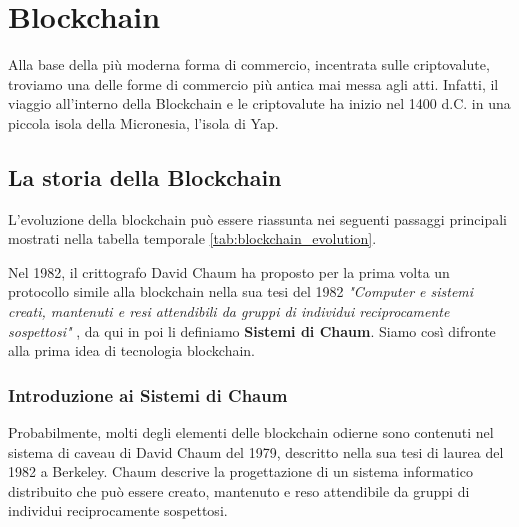 \chapter{Blockchain}
Alla base della più moderna forma di commercio, incentrata sulle criptovalute, troviamo una delle forme di commercio più antica mai messa agli atti. Infatti, il viaggio all'interno della Blockchain e le criptovalute ha inizio nel 1400 d.C. in una piccola isola della Micronesia, l'isola di Yap.

\section{La storia della Blockchain}

L'evoluzione della blockchain può essere riassunta nei seguenti passaggi principali mostrati nella tabella temporale \ref{tab:blockchain_evolution}.

Nel 1982, il crittografo David Chaum ha proposto per la prima volta un protocollo simile alla blockchain nella sua tesi del 1982 \textit{"Computer e sistemi creati, mantenuti e resi attendibili da gruppi di individui reciprocamente sospettosi"} \cite{computer_systems_chaum}, da qui in poi li definiamo \textbf{Sistemi di Chaum}. Siamo così difronte alla prima idea di tecnologia blockchain.

\begin{table}[htbp]
  \centering
  \caption{Evoluzione della Blockchain}
  \label{tab:blockchain_evolution}
\end{table}

\subsection{Introduzione ai Sistemi di Chaum}
Probabilmente, molti degli elementi delle blockchain odierne sono contenuti nel sistema di caveau di David Chaum del 1979, descritto nella sua tesi di laurea del 1982 a Berkeley. Chaum descrive la progettazione di un sistema informatico distribuito che può essere creato, mantenuto e reso attendibile da gruppi di individui reciprocamente sospettosi.


